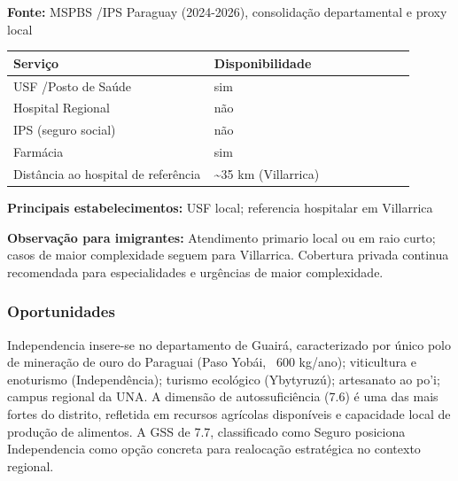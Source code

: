 \textbf{Fonte:} MSPBS /\allowbreak  IPS Paraguay (2024-2026), consolidação
departamental e proxy local

{\def\LTcaptype{none} %
\begin{longtable}{@{}>{\raggedright\arraybackslash}p{0.45\linewidth} >{\raggedright\arraybackslash}p{0.45\linewidth}@{}}
\toprule\noalign{}
Serviço & Disponibilidade \\
\midrule\noalign{}
\endhead
\bottomrule\noalign{}
\endlastfoot
USF /\allowbreak  Posto de Saúde & sim \\
Hospital Regional & não \\
IPS (seguro social) & não \\
Farmácia & sim \\
Distância ao hospital de referência & \textasciitilde35 km
(Villarrica) \\
\end{longtable}
}

\textbf{Principais estabelecimentos:} USF local; referencia hospitalar
em Villarrica

\textbf{Observação para imigrantes:} Atendimento primario local ou em
raio curto; casos de maior complexidade seguem para Villarrica.
Cobertura privada continua recomendada para especialidades e urgências
de maior complexidade.
\newpage

\subsubsection*{Oportunidades}\label{oport-independencia-0405}
Independencia insere-se no departamento de Guairá, caracterizado por único polo de mineração de ouro do Paraguai (Paso Yobái, ~600 kg/ano); viticultura e enoturismo (Independência); turismo ecológico (Ybytyruzú); artesanato ao po'i; campus regional da UNA. A dimensão de autossuficiência (7.6) é uma das mais fortes do distrito, refletida em recursos agrícolas disponíveis e capacidade local de produção de alimentos. A GSS de 7.7, classificado como Seguro posiciona Independencia como opção concreta para realocação estratégica no contexto regional.

